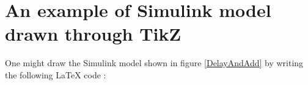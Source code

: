 \documentclass[a4paper]{article}
\begin{document}
\section{An example of Simulink model drawn through TikZ}
\begin{center}
    
     \label{DelayAndAdd}
\end{center}
    One might draw the Simulink model shown in figure \ref{DelayAndAdd} by
writing the following \LaTeX{} code :

\end{document}
